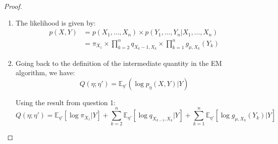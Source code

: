 \documentclass{article}
\begin{document}
\begin{proof}

\smallskip

\begin{enumerate}
\item The likelihood is given by:
\begin{align*}
p(X, Y) &= p(X_1, \ldots, X_n) \times p(Y_1, \ldots, Y_n | X_1, \ldots, X_n)\\
&= \pi_{X_1} \times \prod_{k=2}^n q_{X_k-1, X_k} \times \prod_{k=1}^n g_{\mu, X_k} (Y_k)
\end{align*}

\item Going back to the definition of the intermediate quantity in the EM algorithm, we have:
$$Q(\eta ; \eta') = \mathbb{E}_{\eta'} ( \log p_{\eta} (X, Y) | Y)$$

Using the result from question 1:
$$Q(\eta ; \eta') = \mathbb{E}_{\eta'} [\log \pi_{X_1} | Y] + \sum_{k=2}^n \mathbb{E}_{\eta'} [\log q_{X_{k-1}, X_k} | Y] + \sum_{k=1}^n \mathbb{E}_{\eta'} [\log g_{\mu, X_k} (Y_k)| Y]$$


\end{enumerate}
\end{proof}
\end{document}
